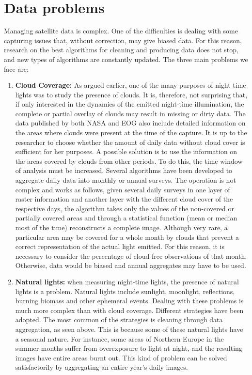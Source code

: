 \section{Data problems}
Managing satellite data is complex. One of the difficulties is dealing with some capturing issues that, without correction, may give biased data. For this reason, research on the best algorithms for cleaning and producing data does not stop, and new types of algorithms are constantly updated. The three main problems we face are:
\begin{enumerate}
\item \textbf{Cloud Coverage:} As argued earlier, one of the many purposes of night-time lights was to study the presence of clouds. It is, therefore, not surprising that, if only interested in the dynamics of the emitted night-time illumination, the complete or partial overlay of clouds may result in missing or dirty data. 
The data published by both NASA and EOG also include detailed information on the areas where clouds were present at the time of the capture. It is up to the researcher to choose whether the amount of daily data without cloud cover is sufficient for her purposes. 
A possible solution is to use the information on the areas covered by clouds from other periods. To do this, the time window of analysis must be increased. Several algorithms have been developed to aggregate daily data into monthly or annual surveys. 
The operation is not complex and works as follows, given several daily surveys in one layer of raster information and another layer with the different cloud cover of the respective days, the algorithm takes only the values of the non-covered or partially covered areas and through a statistical function (mean or median most of the time) reconstructs a complete image.
Although very rare, a particular area may be covered for a whole month by clouds that prevent a correct representation of the actual light emitted. For this reason, it is necessary to consider the percentage of cloud-free observations of that month. Otherwise, data would be biased and annual aggregates may have to be used.
\item \textbf{Natural lights:} when measuring night-time lights, the presence of natural lights is a problem. Natural lights include sunlight, moonlight, reflections, burning biomass and other ephemeral events.
Dealing with these problems is much more complex than with cloud coverage. Different strategies have been adopted.
The most common of the strategies is cleaning through data aggregation, as seen above. This is because some of these natural lights have a seasonal nature. For instance, some areas of Northern Europe in the summer months suffer from overexposure to light at night, and the resulting images have entire areas burnt out. This kind of problem can be solved satisfactorily by aggregating an entire year's daily images.

\end{enumerate}
